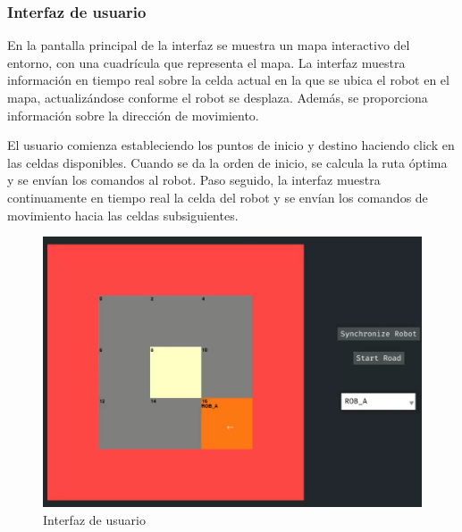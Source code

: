 \subsubsection{Interfaz de usuario}

En la pantalla principal de la interfaz se muestra un mapa interactivo del entorno, con una cuadrícula que representa el mapa. La interfaz muestra información en tiempo real sobre la celda actual en la que se ubica el robot en el mapa, actualizándose conforme el robot se desplaza. Además, se proporciona información sobre la dirección de movimiento.

El usuario comienza estableciendo los puntos de inicio y destino haciendo click en las celdas disponibles. Cuando se da la orden de inicio, se calcula la ruta óptima y se envían los comandos al robot. Paso seguido, la interfaz muestra continuamente en tiempo real la celda del robot y se envían los comandos de movimiento hacia las celdas subsiguientes.

\begin{figure}[H]
    \centering
    \includegraphics[width=0.85\linewidth]{images/interfaz_de_usuario}
    \caption{Interfaz de usuario}
    \label{fig:interfazusuario}
\end{figure}

